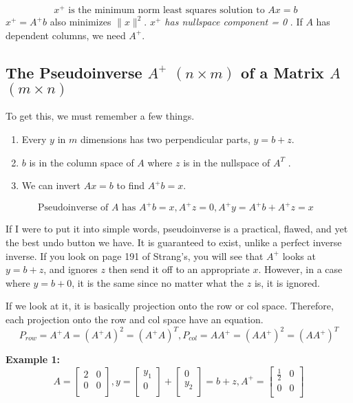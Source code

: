 \[
    \text{\(x^+\) is the minimum norm least squares solution to \(Ax = b\)  }
\]
\(x^+ = A^+ b\) also minimizes \(\lVert x \rVert^2 \). \emph{\(x^+\) has nullspace component = 0 }. If \(A\) has dependent columns, we need \(A^+\).

\subsection{The Pseudoinverse \(A^+\) \((n \times m)\)  of a Matrix \(A\) \((m \times n)\)}

To get this, we must remember a few things. 
\begin{enumerate}
    \item Every \(y\) in \(m\) dimensions has two perpendicular parts, \(y = b + z\).
    \item \(b\) is in the column space of \(A\) where \(z\) is in the nullspace of \(A^T\) .
    \item We can invert \(Ax = b\) to find \(A^+ b = x\).         
\end{enumerate}

\[
    \text{Pseudoinverse of \(A\) has \(A^+ b = x, A^+ z = 0, A^+ y = A^+ b + A^+ z = x\)  }
\]

If I were to put it into simple words, pseudoinverse is a practical, flawed, and yet the best undo button we have. It is guaranteed to exist, unlike a perfect inverse inverse. If you look on page 191 of Strang's, you will see that \(A^+\) looks at \(y = b + z\), and ignores \(z\) then send it off to an appropriate \(x\). However, in a case where \(y = b + 0\), it is the same since no matter what the \(z\) is, it is ignored. 

If we look at it, it is basically projection onto the row or col space. 
Therefore, each projection onto the row and col space have an equation. 
\[
    P_{row} = A^+ A = (A^+ A)^2 = (A^+ A)^T, 
    P_{col} = AA^+ = (A A^+)^2 = (A A^+)^T  
\]

\textbf{Example 1:} 
\[
    A = 
    \begin{bmatrix}
        2 &  0 \\
        0 &  0 \\
    \end{bmatrix}, 
    y = 
    \begin{bmatrix}
         y_1 \\
         0 \\
    \end{bmatrix}
    + 
    \begin{bmatrix}
         0 \\
         y_2 \\
    \end{bmatrix}
    = b + z , 
    A^+ = 
    \begin{bmatrix}
        \frac{1}{2} & 0  \\
        0 & 0  \\
    \end{bmatrix}
\] 

